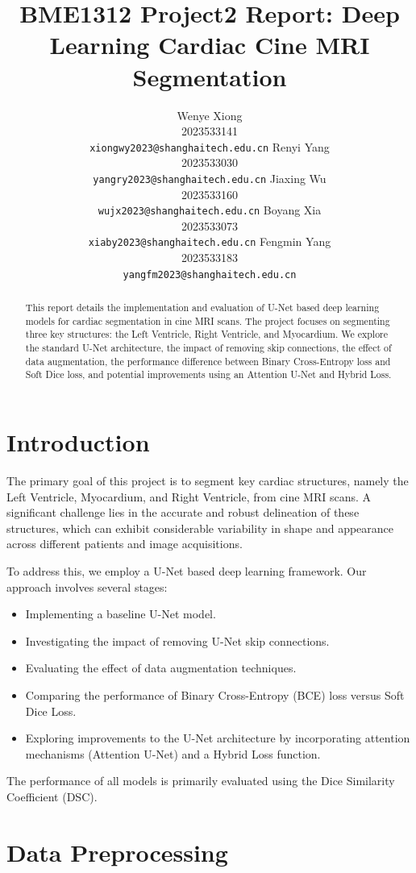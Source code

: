 \documentclass{article}
\title{BME1312 Project2 Report: Deep Learning Cardiac Cine MRI Segmentation}
\author{%
  Wenye Xiong \\
  2023533141 \\
  \texttt{xiongwy2023@shanghaitech.edu.cn}
  \And
  Renyi Yang \\
  2023533030 \\
  \texttt{yangry2023@shanghaitech.edu.cn}
  \AND
  Jiaxing Wu \\
  2023533160 \\
  \texttt{wujx2023@shanghaitech.edu.cn}
  \And
  Boyang Xia \\
  2023533073 \\
  \texttt{xiaby2023@shanghaitech.edu.cn}
  \AND
  Fengmin Yang \\
  2023533183 \\
  \texttt{yangfm2023@shanghaitech.edu.cn}
}
\begin{document}
\maketitle


\begin{abstract}
  This report details the implementation and evaluation of U-Net based deep learning models for cardiac segmentation
  in cine MRI scans. The project focuses on segmenting three key structures: the Left Ventricle, Right Ventricle,
  and Myocardium. We explore the standard U-Net architecture, the impact of removing skip connections, the effect of
  data augmentation, the performance difference between Binary Cross-Entropy loss and Soft Dice loss, and potential improvements using an Attention U-Net and Hybrid Loss.
\end{abstract}

\section{Introduction}
The primary goal of this project is to segment key cardiac structures, namely the Left Ventricle, Myocardium, and Right Ventricle, from cine MRI scans. A significant challenge lies in the accurate and robust delineation of these structures, which can exhibit considerable variability in shape and appearance across different patients and image acquisitions.

To address this, we employ a U-Net based deep learning framework. Our approach involves several stages:
\begin{itemize}
  \item Implementing a baseline U-Net model.
  \item Investigating the impact of removing U-Net skip connections.
  \item Evaluating the effect of data augmentation techniques.
  \item Comparing the performance of Binary Cross-Entropy (BCE) loss versus Soft Dice Loss.
  \item Exploring improvements to the U-Net architecture by incorporating attention mechanisms (Attention U-Net) and a Hybrid Loss function.
\end{itemize}
The performance of all models is primarily evaluated using the Dice Similarity Coefficient (DSC).

\section{Data Preprocessing}
\end{document}
